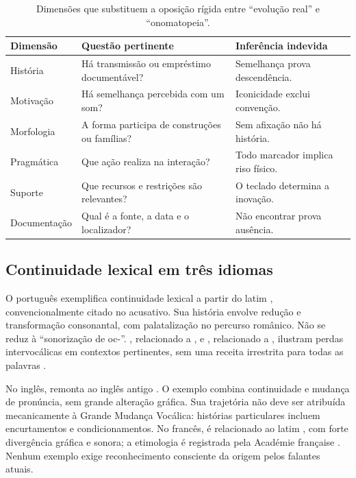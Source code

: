 \begin{table}[htbp]\centering\small
\caption{Dimensões que substituem a oposição rígida entre ``evolução real'' e ``onomatopeia''.}
\begin{tabularx}{\textwidth}{p{}YY}\toprule
Dimensão & Questão pertinente & Inferência indevida\\\midrule
História & Há transmissão ou empréstimo documentável? & Semelhança prova descendência.\\
Motivação & Há semelhança percebida com um som? & Iconicidade exclui convenção.\\
Morfologia & A forma participa de construções ou famílias? & Sem afixação não há história.\\
Pragmática & Que ação realiza na interação? & Todo marcador implica riso físico.\\
Suporte & Que recursos e restrições são relevantes? & O teclado determina a inovação.\\
Documentação & Qual é a fonte, a data e o localizador? & Não encontrar prova ausência.\\\bottomrule
\end{tabularx}\end{table}

\subsection{Continuidade lexical em três idiomas}
O português  exemplifica continuidade lexical a partir do latim , convencionalmente citado no acusativo. Sua história envolve redução e transformação consonantal, com palatalização no percurso românico. Não se reduz à ``sonorização de oc-''. , relacionado a , e , relacionado a , ilustram perdas intervocálicas em contextos pertinentes, sem uma receita irrestrita para todas as palavras \cite{ilari2018,campbell2021}.

No inglês,  remonta ao inglês antigo . O exemplo combina continuidade e mudança de pronúncia, sem grande alteração gráfica. Sua trajetória não deve ser atribuída mecanicamente à Grande Mudança Vocálica: histórias particulares incluem encurtamentos e condicionamentos. No francês,  é relacionado ao latim , com forte divergência gráfica e sonora; a etimologia é registrada pela Académie française \cite{gooddict,academieeau}. Nenhum exemplo exige reconhecimento consciente da origem pelos falantes atuais.

